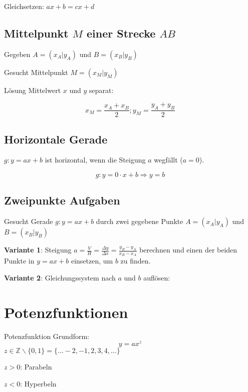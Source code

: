 \begin{multicols}{2}
Gleichsetzen: $ax+b = cx+d$


\subsection*{Mittelpunkt $M$ einer Strecke $AB$}
Gegeben $A=(x_A|y_A)$ und $B=(x_B|y_B)$

Gesucht Mittelpunkt $M=(x_M|y_M)$

Lösung Mittelwert $x$ und $y$ separat:

$$x_M = \frac{x_A+x_B}2; y_M=\frac{y_A+y_B}2$$

\subsection*{Horizontale Gerade}

$g: y=ax+b$ ist horizontal, wenn die Steigung $a$ wegfällt ($a=0$).

$$g:  y=0\cdot{}x+b \Rightarrow y=b$$

\subsection*{Zweipunkte Aufgaben}
Gesucht Gerade $g: y=ax+b$ durch zwei gegebene Punkte $A=(x_A|y_A)$
und $B=(x_B|y_B)$

\textbf{Variante 1}: Steigung $a = \frac{V}H = \frac{\Delta y}{\Delta x}
= \frac{y_B-y_A}{x_B-x_A}$ berechnen und einen der beiden Punkte in
$y=ax+b$ einsetzen, um $b$ zu finden.

\textbf{Variante 2}: Gleichungssystem nach $a$ und $b$ auf\/lösen:

\hrulefill

\section*{Potenzfunktionen}

\begin{definition*}{Potenzfunktion}{}
Grundform:
$$y=ax^z$$
$z\in\mathbb{Z}\backslash\{0,1\} = \{...-2, -1, 2, 3, 4, ...\}$
\end{definition*}

$z>0$: Parabeln



$z<0$: Hyperbeln


\end{multicols}
